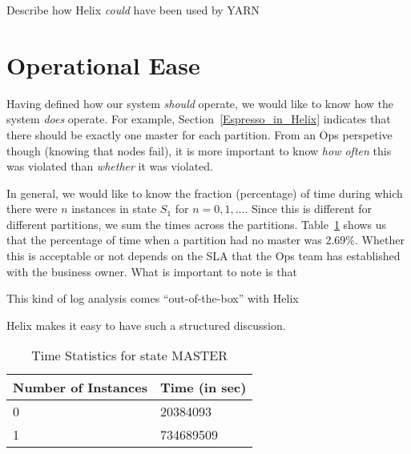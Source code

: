Describe how Helix {\it could} have been used by YARN \TBCKG
\section{Operational Ease}
\label{Operational_Ease}

Having defined how our system {\it should} operate, we would like to
know how the system {\it does} operate.  For example,
Section~\ref{Espresso_in_Helix} indicates that there should be exactly
one master for each partition. From an Ops perspetive though (knowing
that nodes fail), it is more important to know {\em how often} this
was violated than {\em whether} it was violated.

In general, we would like to know the fraction (percentage) of time
during which there were \(n\) instances in state \(S_1\) for \(n =
0,1, \ldots\). Since this is different for different partitions, we
sum the times across the partitions.
Table~\ref{tbl_master_time_stats} shows us that the percentage of time
when a partition had no master was 2.69\%. Whether this is acceptable
or not depends on the SLA that the Ops team has established with the
business owner. What is important to note is that
\be
\item This kind of log analysis comes ``out-of-the-box'' with Helix
\item Helix makes it easy to have such a structured discussion.
\ee
\begin{table}[h]
\centering
\begin{tabular}{|l|l|} \hline \hline
{\bf Number of Instances} & {\bf Time (in sec) } \\ \hline \hline
0 & 20384093 \\ \hline 
1 & 734689509 \\ \hline 
\hline 
\end{tabular}
\caption{Time Statistics for state MASTER}
\label{tbl_master_time_stats}
\end{table}


%

